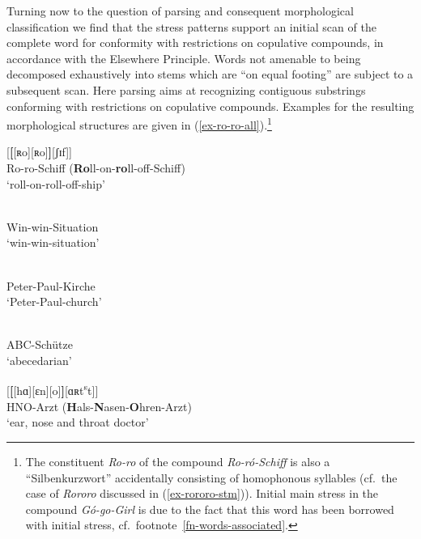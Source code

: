 \documentclass[output=paper
 ,nobabel
 ,draftmode
 ,colorlinks, citecolor=brown
]{langscibook}
\begin{document}
Turning now to the question of parsing and consequent morphological classification we find that the stress patterns support an initial scan of the complete word for conformity with restrictions on copulative compounds, in accordance with the Elsewhere Principle. Words not amenable to being decomposed exhaustively into stems which are ``on equal footing'' are subject to a subsequent scan. Here parsing aims at recognizing contiguous substrings conforming with restrictions on copulative compounds. Examples for the resulting morphological structures are given in (\ref{ex-ro-ro-all}).\footnote{The  constituent \emph{Ro-ro} of the compound \emph{Ro-ró-Schiff} is also a ``Silbenkurzwort'' accidentally consisting of homophonous syllables (cf.\ the case of \emph{Rororo} discussed in (\ref{ex-rororo-stm})). Initial main stress in the compound \emph{Gó-go-Girl} is due to the fact that this word has been borrowed with initial stress, cf.\ footnote~\ref{fn-words-associated}.}


\eal\label{ex-ro-ro-all}
\ex\label{ex-ro-ro}
 {[\textbf{[}[ʀo][ʀo]\textbf{]}[ʃɪf]]}\\
Ro-ro-Schiff (\textbf{Ro}ll-on-\textbf{ro}ll-off-Schiff)\\
`roll-on-roll-off-ship'

\\
Win-win-Situation\\
`win-win-situation'

\\
Peter-Paul-Kirche\\
`Peter-Paul-church'

\\
ABC-Schütze\\
`abecedarian'

\ex\label{ex-hno} {[\textbf{[}[hɑ][ɛn][o]\textbf{]}[ɑʀt\textsuperscript{s}t]]}\\
HNO-Arzt (\textbf{H}als-\textbf{N}asen-\textbf{O}hren-Arzt)\\
`ear, nose and throat doctor'

\zl
\end{document}
